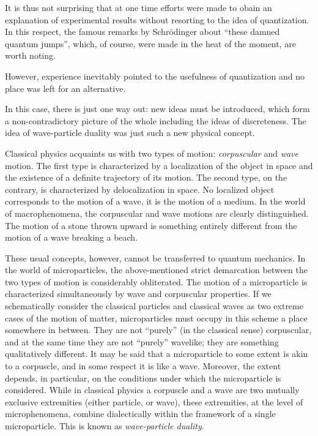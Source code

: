 \documentclass[a4paper,sfsidenotes,colorlinks=true]{tufte-book}
\numberwithin{equation}{section}
\numberwithin{figure}{section}
\begin{document}
It is thus not surprising that at one time efforts were made to obain
an explanation of experimental results without resorting to the idea
of quantization. In this respect, the famous remarks by Schr\"odinger
about ``these damned quantum jumps'', which, of course, were made in the
heat of the moment, are worth noting.

However, experience inevitably pointed to the usefulness of
quantization and no place was left for an alternative.

In this case, there is just one way out: new ideas must be introduced,
which form a non-contradictory picture of the whole including the
ideas of discreteness. The idea of wave-particle duality was just such
a new physical concept.

Classical physics  acquaints
us with two types of motion: \emph{corpuscular} and \emph{wave}
motion. The first type is characterized by a localization of the
object in space and the existence of a definite trajectory of its
motion. The second type, on the contrary, is characterized by
delocalization in space. No localized object corresponds to the motion
of a wave, it is the motion of a medium. In the world of
macrophenomena, the corpuscular and wave motions are clearly
distinguished. The motion of a stone thrown upward is something
entirely different from the motion of a wave breaking a beach.

These usual concepts, however, cannot be transferred to quantum
mechanics. In the world of microparticles, the above-mentioned strict
demarcation between the two types of motion is considerably
obliterated. The motion of a microparticle is characterized
simultaneously by wave and corpuscular properties. If we schematically
consider the classical particles and classical waves as two extreme
cases of the motion of matter, microparticles must occupy in this
scheme a place somewhere in between. They are not ``purely'' (in the
classical sense) corpuscular, and at the same time they are not
``purely'' wavelike; they are something qualitatively different. It may
be said that a microparticle to some extent is akin to a corpuscle,
and in some respect it is like a wave. Moreover, the extent depends,
in particular, on the conditions under which the microparticle is
considered. While in classical physics a corpuscle and a wave are two
mutually exclusive extremities (either particle, or wave), these
extremities, at the level of microphenomena, combine dialectically
within the framework of a single microparticle. This is known as
\emph{wave-particle duality}.
\end{document}
